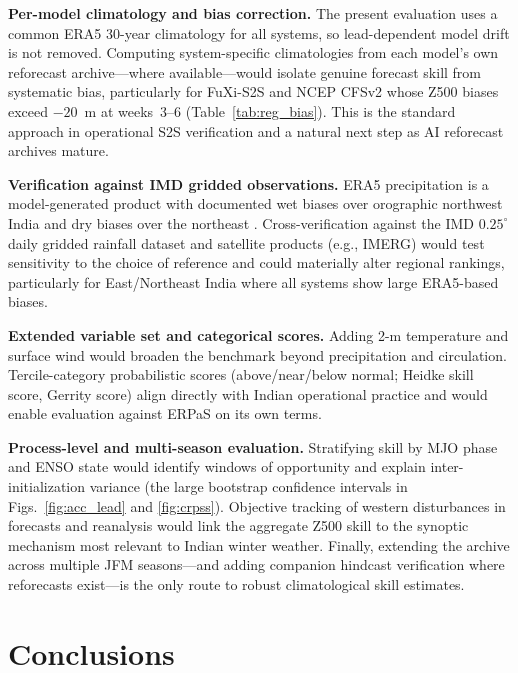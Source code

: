 \documentclass[11pt,a4paper]{article}
\begin{document}
\textbf{Per-model climatology and bias correction.} The present
evaluation uses a common ERA5 30-year climatology for all systems,
so lead-dependent model drift is not removed. Computing system-specific
climatologies from each model's own reforecast archive---where
available---would isolate genuine forecast skill from systematic bias,
particularly for FuXi-S2S and NCEP CFSv2 whose Z500 biases exceed
$-20$~m at weeks~3--6 (Table~\ref{tab:reg_bias}). This is the standard
approach in operational S2S verification \citep{vitart2017} and a
natural next step as AI reforecast archives mature.

\textbf{Verification against IMD gridded observations.} ERA5
precipitation is a model-generated product with documented wet biases
over orographic northwest India and dry biases over the northeast
\citep{pai2014,hersbach2020}. Cross-verification against the IMD
$0.25^\circ$ daily gridded rainfall dataset \citep{pai2014} and
satellite products (e.g., IMERG) would test sensitivity to the choice
of reference and could materially alter regional rankings, particularly
for East/Northeast India where all systems show large ERA5-based
biases.

\textbf{Extended variable set and categorical scores.}
Adding 2-m temperature and surface wind would broaden the benchmark
beyond precipitation and circulation. Tercile-category probabilistic
scores (above/near/below normal; Heidke skill score, Gerrity score)
align directly with Indian operational practice \citep{pattanaik2019,
wilks2019} and would enable evaluation against ERPaS on its own terms.

\textbf{Process-level and multi-season evaluation.}
Stratifying skill by MJO phase \citep{wheelerhendon2004} and ENSO
state \citep{mariotti2020,domeisen2022} would identify windows of
opportunity and explain inter-initialization variance (the large
bootstrap confidence intervals in Figs.~\ref{fig:acc_lead} and
\ref{fig:crpss}). Objective tracking of western disturbances in
forecasts and reanalysis \citep{hunt2018,dimri2015} would link the
aggregate Z500 skill to the synoptic mechanism most relevant to Indian
winter weather. Finally, extending the archive across multiple JFM
seasons---and adding companion hindcast verification where reforecasts
exist---is the only route to robust climatological skill estimates.

\section{Conclusions}\label{sec:conclusions}
\end{document}
